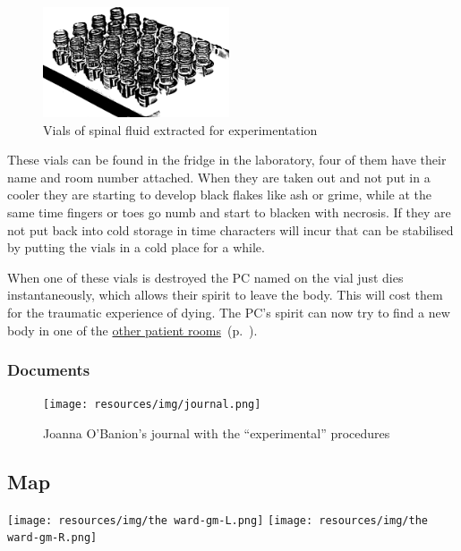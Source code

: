 \documentclass[bg-full]{resources/stylesheets/kult}
\begin{document}
\begin{figure}[!htbp]
  \centering
  \includegraphics[width=5.5cm, keepaspectratio]{resources/img/test tubes.png}
  \caption{Vials of spinal fluid extracted for experimentation}\label{vials}
\end{figure}
These vials can be found in the fridge in the laboratory, four of them have their name and room number attached.  When they are
taken out and not put in a cooler they are starting to develop black flakes like ash or grime, while at the same time fingers
or toes go numb and start to blacken with necrosis.  If they are not put back into cold storage in time characters will incur
 that can be stabilised by putting the vials in a cold place for a while.

When one of these vials is destroyed the PC named on the vial just dies instantaneously, which allows their spirit to leave the
body.  This will cost them  for the traumatic experience of dying.  The PC's spirit can now try to find a new
body in one of the \hyperref[ssub:other_patient_rooms]{other patient rooms}~(p.~\pageref{ssub:other_patient_rooms}).

\subsubsection{Documents}%
\label{ssub:documents}

\begin{figure}[!htbp]
  \centering
  \texttt{[image: resources/img/journal.png]}
  \caption{Joanna O'Banion's journal with the “experimental” procedures}\label{notebook}
\end{figure}

\clearpage %
\onecolumn
\subsection{Map}%
\label{sub:map}
\hspace*{-0.5cm}%
\texttt{[image: resources/img/the ward-gm-L.png]}
\newpage
\vspace*{0.55cm}%
\hspace*{-2.0cm}%
\texttt{[image: resources/img/the ward-gm-R.png]}
\end{document}
